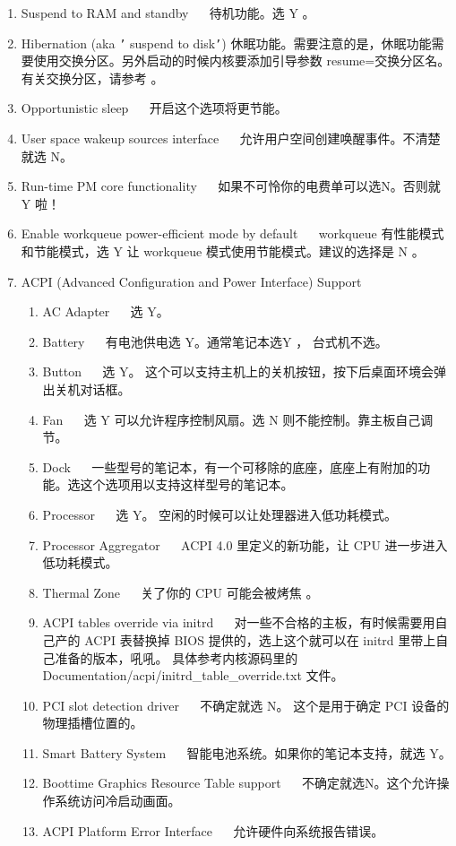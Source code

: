\begin{enumerate}

\item Suspend to RAM and standby ~~ 待机功能。选 Y 。
\item Hibernation (aka \texttt{'} suspend to disk\texttt{'}) 休眠功能。需要注意的是，休眠功能需要使用交换分区。另外启动的时候内核要添加引导参数 resume=交换分区名。 有关交换分区，请参考 。

\item Opportunistic sleep ~~ 开启这个选项将更节能。
\item User space wakeup sources interface ~~ 允许用户空间创建唤醒事件。不清楚就选 N。

\item Run-time PM core functionality ~~ 如果不可怜你的电费单可以选N。否则就 Y 啦！

\item Enable workqueue power-efficient mode by default ~~ workqueue 有性能模式和节能模式，选 Y 让 workqueue 模式使用节能模式。建议的选择是 N 。

\item ACPI (Advanced Configuration and Power Interface) Support

\begin{enumerate}
\item AC Adapter ~~ 选 Y。

\item Battery ~~ 有电池供电选 Y。通常笔记本选Y ， 台式机不选。
\item Button ~~ 选 Y。 这个可以支持主机上的关机按钮，按下后桌面环境会弹出关机对话框。
\item Fan ~~ 选 Y 可以允许程序控制风扇。选 N 则不能控制。靠主板自己调节。
\item Dock ~~ 一些型号的笔记本，有一个可移除的底座，底座上有附加的功能。选这个选项用以支持这样型号的笔记本。
\item Processor ~~ 选 Y。 空闲的时候可以让处理器进入低功耗模式。
\item Processor Aggregator ~~ ACPI 4.0 里定义的新功能，让 CPU 进一步进入低功耗模式。
\item Thermal Zone ~~ 关了你的 CPU 可能会被烤焦 。
\item  ACPI tables override via initrd ~~ 对一些不合格的主板，有时候需要用自己产的 ACPI 表替换掉 BIOS 提供的，选上这个就可以在 initrd 里带上自己准备的版本，吼吼。 具体参考内核源码里的 Documentation/acpi/initrd\_table\_override.txt  文件。
\item PCI slot detection driver ~~ 不确定就选 N。 这个是用于确定 PCI 设备的物理插槽位置的。
\item Smart Battery System ~~ 智能电池系统。如果你的笔记本支持，就选 Y。
\item Boottime Graphics Resource Table support ~~ 不确定就选N。这个允许操作系统访问冷启动画面。
\item ACPI Platform Error Interface ~~ 允许硬件向系统报告错误。
\end{enumerate}


\end{enumerate}
